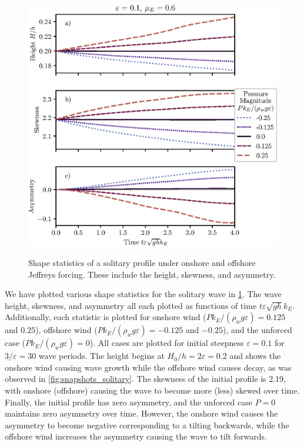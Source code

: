 \documentclass{jfm}
\renewcommand*{\epsilon}{\varepsilon}
\begin{document}
\begin{figure}
  \centering
  { %
    \label{fig:statistics_solitary:a}
    \label{fig:statistics_solitary:b}
    \label{fig:statistics_solitary:c}
  }
  \includegraphics{Skew-Asymm-No-Peak.eps}
  \caption{
    Shape statistics of a solitary profile under onshore and offshore
    Jeffreys forcing.
    These include the
    height,
    skewness, and
    asymmetry.
  }
  \label{fig:statistics_solitary}
\end{figure}

We have plotted various shape statistics for the solitary wave in
\cref{fig:statistics_solitary}.
The  wave height,
 skewness, and
 asymmetry all each plotted as
functions of time $t \epsilon \sqrt{g h} k_E$.
Additionally, each statistic is plotted for onshore wind ($P
k_E/(\rho_w g \epsilon) = 0.125$ and $0.25$), offshore wind ($P
k_E/(\rho_w g \epsilon) = -0.125$ and $-0.25$), and the unforced case
($P k_E/(\rho_w g \epsilon) = 0$).
All cases are plotted for initial steepness $\epsilon = 0.1$ for
$3/\epsilon = 30$ wave periods.
The height  begins at $H_0/h = 2
\epsilon = 0.2$ and shows the onshore wind
causing wave growth while the offshore wind causes decay, as was
observed in \cref{fig:snapshots_solitary}.
The skewness of the initial profile is \num{2.19}, with onshore
(offshore) causing the wave to become more (less) skewed over time.
Finally, the initial profile has zero asymmetry, and the unforced case
$P=0$ maintains zero asymmetry over time.
However, the onshore wind causes the asymmetry to become negative
corresponding to a tilting backwards, while the offshore wind increases
the asymmetry causing the wave to tilt forwards.
\end{document}
